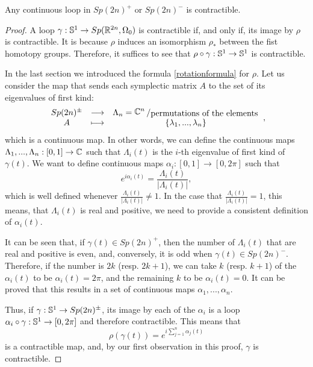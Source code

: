 \begin{theo} \label{sppmcontractible}
Any continuous loop in $Sp(2n)^+$ or $Sp(2n)^-$ is contractible. 
\end{theo}

\begin{proof}
A loop $\gamma : \mathbb{S}^1 \rightarrow Sp(\mathbb{R}^{2n},\Omega_0)$ is contractible if, and only if, its image by $\rho$ is contractible. It is because $\rho$ induces an isomorphism $\rho_{\ast}$ between the fist homotopy groups. Therefore, it suffices to see that $\rho \circ \gamma : \mathbb{S}^1 \rightarrow \mathbb{S}^1$ is contractible.

In the last section we introduced the formula \ref{rotationformula} for $\rho$. Let us consider the map that sends each symplectic matrix $A$ to the set of its eigenvalues of first kind:
\[\begin{array}{ccc} Sp(2n)^{\pm} & \longrightarrow & \Lambda_n = \quocient{\C^n}{\text{permutations of the elements}} \\ A & \longmapsto & \{\lambda_1,...,\lambda_n\} \end{array} ,\]
which is a continuous map. In other words, we can define the continuous maps $\Lambda_1,...,\Lambda_n : [0,1] \rightarrow \mathbb{C}$ such that $\Lambda_i(t)$ is the $i$-th eigenvalue of first kind of $\gamma(t)$. We want to define continuous maps $\alpha_i : [0,1] \rightarrow [0,2\pi]$ such that
\[e^{i \alpha_i(t)} = \frac{\Lambda_i(t)}{|\Lambda_i(t)|} ,\]
which is well defined whenever $\frac{\Lambda_i(t)}{|\Lambda_i(t)|} \neq 1$. In the case that $\frac{\Lambda_i(t)}{|\Lambda_i(t)|} = 1$, this means, that $\Lambda_i(t)$ is real and positive, we need to provide a consistent definition of $\alpha_i(t)$.

It can be seen that, if $\gamma(t) \in Sp(2n)^+$, then the number of $\Lambda_i(t)$ that are real and positive is even, and, conversely, it is odd when $\gamma(t) \in Sp(2n)^-$. Therefore, if the number is $2k$ (resp. $2k+1$), we can take $k$ (resp. $k+1$) of the $\alpha_i(t)$ to be $\alpha_i(t) = 2\pi$, and the remaining $k$ to be $\alpha_i(t) = 0$. It can be proved that this results in a set of continuous maps $\alpha_1,...,\alpha_n$.

Thus, if $\gamma : \mathbb{S}^1 \rightarrow Sp(2n)^{\pm}$, its image by each of the $\alpha_i$ is a loop $\alpha_i \circ \gamma : \mathbb{S}^1 \rightarrow [0,2\pi]$ and therefore contractible. This means that
\[\rho(\gamma(t)) = e^{i \sum_{j=1}^n \alpha_j(t)}\]
is a contractible map, and, by our first observation in this proof, $\gamma$ is contractible.
\end{proof}

